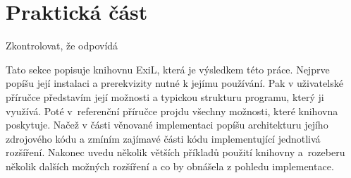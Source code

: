 \section{Praktická část}

\begin{framed}
  Zkontrolovat, že odpovídá
\end{framed}

Tato sekce popisuje knihovnu ExiL\footnotemark, která je výsledkem této práce.
Nejprve popíšu její instalaci a prerekvizity nutné k jejímu používání. Pak v
uživatelské příručce představím její možnosti a typickou strukturu programu,
který ji využívá.  Poté v~referenční příručce projdu všechny možnosti, které
knihovna poskytuje.  Načež v části věnované implementaci popíšu architekturu
jejího zdrojového kódu a zmíním zajímavé části kódu implementující jednotlivá
rozšíření.  Nakonec uvedu několik větších příkladů použití knihovny a~rozeberu
několik dalších možných rozšíření a co by obnášela z pohledu implementace.



\clearpage

\clearpage

% 
\clearpage

